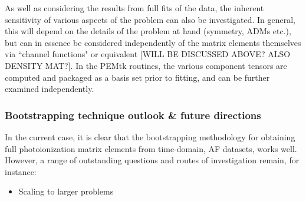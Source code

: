 As well as considering the results from full fits of the data, the inherent sensitivity of various aspects of the problem can also be investigated. In general, this will depend on the details of the problem at hand (symmetry, ADMs etc.), but can in essence be considered independently of the matrix elements themselves via ``channel functions" or equivalent [WILL BE DISCUSSED ABOVE? ALSO DENSITY MAT?]. In the PEMtk routines, the various component tensors are computed and packaged as a basis set prior to fitting, and can be further examined independently.


\subsubsection{Bootstrapping technique outlook \& future directions}

In the current case, it is clear that the bootstrapping methodology for obtaining full photoionization matrix elements from time-domain, AF datasets, works well. However, a range of outstanding questions and routes of investigation remain, for instance:

\begin{itemize}
\item Scaling to larger problems
\end{itemize}
